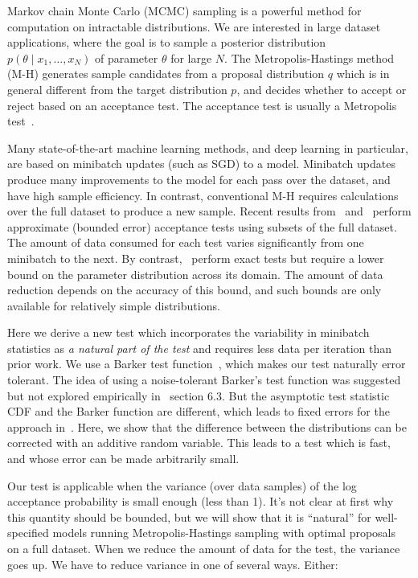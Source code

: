 \documentclass[twoside]{article} \usepackage{aistats2017}
\begin{document}
Markov chain Monte Carlo (MCMC) sampling is a powerful method for computation on
intractable distributions. We are interested in large dataset applications,
where the goal is to sample a posterior distribution $p(\theta \mid x_1, \ldots,
x_N)$ of parameter $\theta$ for large $N$.  The Metropolis-Hastings method (M-H)
generates sample candidates from a proposal distribution $q$ which is in general
different from the target distribution $p$, and decides whether to accept or
reject based on an acceptance test. The acceptance test is usually a Metropolis
test~\citep{Metropolis1953, hastings70}.

Many state-of-the-art machine learning methods, and deep learning in particular,
are based on minibatch updates (such as SGD) to a model.  Minibatch updates
produce many improvements to the model for each pass over the dataset, and have
high sample efficiency.  In contrast, conventional M-H requires calculations
over the full dataset to produce a new sample.  Recent results
from~\citet{cutting_mh_2014} and~\citet{icml2014c1_bardenet14} perform
approximate (bounded error) acceptance tests using subsets of the full dataset.
The amount of data consumed for each test varies significantly from one
minibatch to the next. By contrast,~\citet{conf/uai/MaclaurinA14,TallData15}
perform exact tests but require a lower bound on the parameter distribution across
its domain.  The amount of data reduction depends on the accuracy of this bound,
and such bounds are only available for relatively simple distributions.

Here we derive a new test which incorporates the variability in minibatch
statistics as {\em a natural part of the test} and requires less data per
iteration than prior work. We use a Barker test function~\citep{Barker65}, which
makes our test naturally error tolerant. The idea of using a noise-tolerant
Barker's test function was suggested but not explored empirically
in~\citet{TallData15} section 6.3. But the asymptotic test statistic CDF and the
Barker function are different, which leads to fixed errors for the approach
in~\citet{TallData15}. Here, we show that the difference between the
distributions can be corrected with an additive random variable. This leads to a
test which is fast, and whose error can be made arbitrarily small.

Our test is applicable when the variance (over data samples) of the log
acceptance probability is small enough (less than 1). It's not clear at first why
this quantity should be bounded, but we will show that it is ``natural'' for
well-specified models running Metropolis-Hastings sampling with optimal
proposals~\citep{OptimalScaling01} on a full dataset. When we reduce the amount
of data for the test, the variance goes up. We have to reduce variance in one
of several ways. Either:
\end{document}
